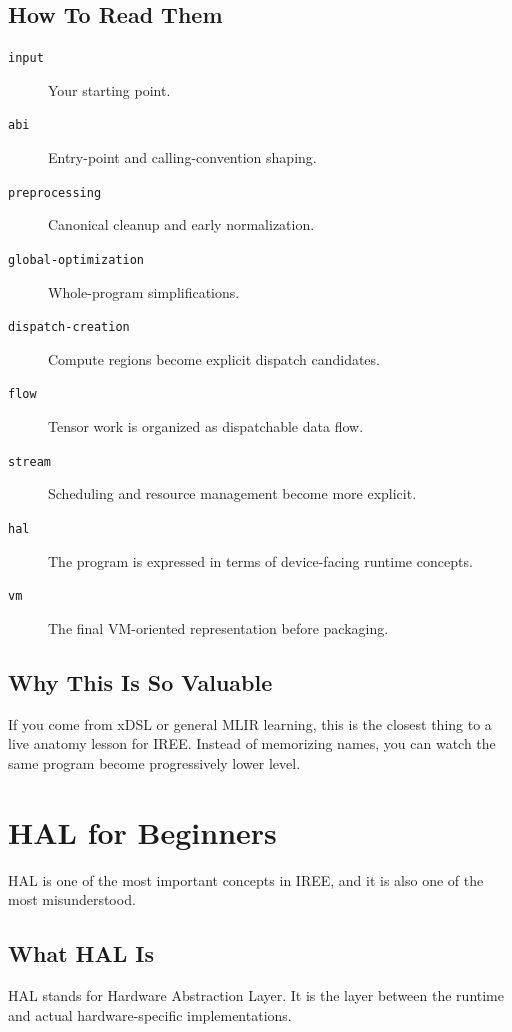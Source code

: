 \documentclass[11pt,a4paper]{article}
\begin{document}
\subsection{How To Read Them}

\begin{description}
    \item[\texttt{input}] Your starting point.
    \item[\texttt{abi}] Entry-point and calling-convention shaping.
    \item[\texttt{preprocessing}] Canonical cleanup and early normalization.
    \item[\texttt{global-optimization}] Whole-program simplifications.
    \item[\texttt{dispatch-creation}] Compute regions become explicit dispatch candidates.
    \item[\texttt{flow}] Tensor work is organized as dispatchable data flow.
    \item[\texttt{stream}] Scheduling and resource management become more explicit.
    \item[\texttt{hal}] The program is expressed in terms of device-facing runtime concepts.
    \item[\texttt{vm}] The final VM-oriented representation before packaging.
\end{description}

\subsection{Why This Is So Valuable}

If you come from xDSL or general MLIR learning, this is the closest thing to a live anatomy lesson for IREE. Instead of memorizing names, you can watch the same program become progressively lower level.

\section{HAL for Beginners}

HAL is one of the most important concepts in IREE, and it is also one of the most misunderstood.

\subsection{What HAL Is}

HAL stands for Hardware Abstraction Layer. It is the layer between the runtime and actual hardware-specific implementations.
\end{document}
